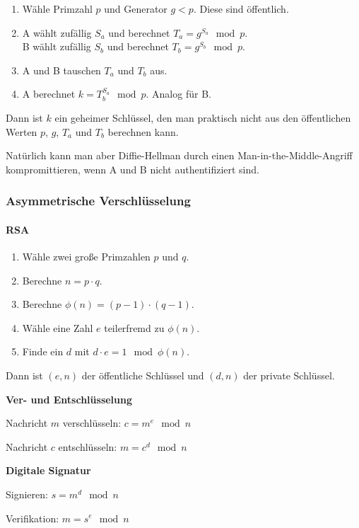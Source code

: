 \documentclass[a4paper,parskip=half*,DIV=15,fontsize=11pt]{scrartcl}
\begin{document}
\begin{enumerate}
\item Wähle Primzahl $p$ und Generator $g < p$. Diese sind öffentlich.
\item A wählt zufällig $S_a$ und berechnet $T_a = g^{S_a} \mod p$.\\
      B wählt zufällig $S_b$ und berechnet $T_b = g^{S_b} \mod p$.
\item A und B tauschen $T_a$ und $T_b$ aus.
\item A berechnet $k = T_b^{S_a} \mod p$. Analog für B.
\end{enumerate}

Dann ist $k$ ein geheimer Schlüssel, den man praktisch nicht aus den öffentlichen Werten $p$, $g$, $T_a$ und $T_b$ berechnen kann.

Natürlich kann man aber Diffie-Hellman durch einen Man-in-the-Middle-Angriff kompromittieren, wenn A und B nicht authentifiziert sind.

\subsubsection{Asymmetrische Verschlüsselung}

\paragraph{RSA}

\begin{enumerate}
\item Wähle zwei große Primzahlen $p$ und $q$.
\item Berechne $n = p \cdot q$.
\item Berechne $\phi(n) = (p - 1) \cdot (q - 1)$.
\item Wähle eine Zahl $e$ teilerfremd zu $\phi(n)$.
\item Finde ein $d$ mit $d \cdot e = 1 \mod \phi(n)$.
\end{enumerate}

Dann ist $(e, n)$ der öffentliche Schlüssel und $(d, n)$ der private Schlüssel.

\begin{minipage}[t]{0.5\textwidth}
\textbf{Ver- und Entschlüsselung}

Nachricht $m$ verschlüsseln: $c = m^e \mod n$

Nachricht $c$ entschlüsseln: $m = c^d \mod n$
\end{minipage}
\begin{minipage}[t]{0.5\textwidth}
\textbf{Digitale Signatur}

Signieren: $s = m^d \mod n$

Verifikation: $m = s^e \mod n$
\end{minipage}
\end{document}
